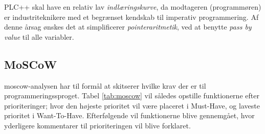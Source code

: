 \noindent PLC++ skal have en relativ lav \textit{indlæringskurve}, da modtageren (programmøren) er industriteknikere med et begrænset kendskab til imperativ programmering. Af denne årsag ønskes det at simplificerer \textit{pointeraritmetik}, ved at benytte \textit{pass by value} til alle variabler. 

\subsection{MoSCoW}\label{ssec:moscow}
\gls{moscow}-analysen har til formål at skitserer hvilke krav der er til programmeringssproget. Tabel \ref{tab:moscow} vil således opstille funktionerne efter prioriteringer; hvor den højeste prioritet vil være placeret i Must-Have, og laveste prioritet i Want-To-Have. Efterfølgende vil funktionerne blive gennemgået, hvor yderligere kommentarer til prioriteringen vil blive forklaret.

